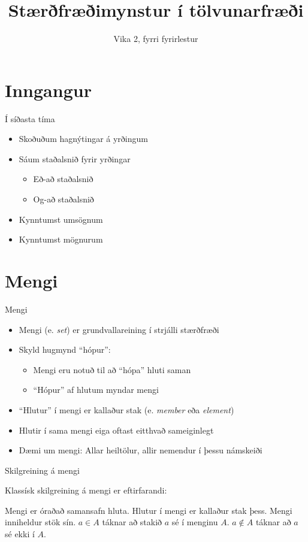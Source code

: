 \documentclass{beamer}
\title{Stærðfræðimynstur í tölvunarfræði}
\subtitle{Vika 2, fyrri fyrirlestur}
\begin{document}
\begin{frame}
\titlepage
\end{frame}

\section{Inngangur}

\begin{frame}{Í síðasta tíma}
\begin{itemize}
 \item Skoðuðum hagnýtingar á yrðingum
 \item Sáum staðalsnið fyrir yrðingar
 \begin{itemize}
  \item Eð-að staðalsnið
  \item Og-að staðalsnið
 \end{itemize}
 \item Kynntumst umsögnum
 \item Kynntumst mögnurum
\end{itemize}
\end{frame}

\section{Mengi}

\begin{frame}{Mengi}
\begin{itemize}
 \item Mengi (e. \emph{set}) er grundvallareining í strjálli stærðfræði
 \item Skyld hugmynd ``hópur'':
 \begin{itemize}
  \item Mengi eru notuð til að ``hópa'' hluti saman
  \item ``Hópur'' af hlutum myndar mengi
 \end{itemize}
 \item ``Hlutur'' í mengi er kallaður stak (e. \emph{member} eða \emph{element})
 \item Hlutir í sama mengi eiga oftast eitthvað sameiginlegt
 \item Dæmi um mengi: Allar heiltölur, allir nemendur í þessu námskeiði
\end{itemize}
\end{frame}

\begin{frame}{Skilgreining á mengi}

Klassísk skilgreining á mengi er eftirfarandi:
\begin{tcolorbox}[title=Mengi]
Mengi er óraðað samansafn hluta. Hlutur í mengi er kallaður stak þess. Mengi inniheldur stök sín. $a \in A$ táknar að stakið $a$ sé í menginu $A$. $a \notin A$ táknar að $a$ sé ekki í $A$.
\end{tcolorbox}

\end{frame}
\end{document}
